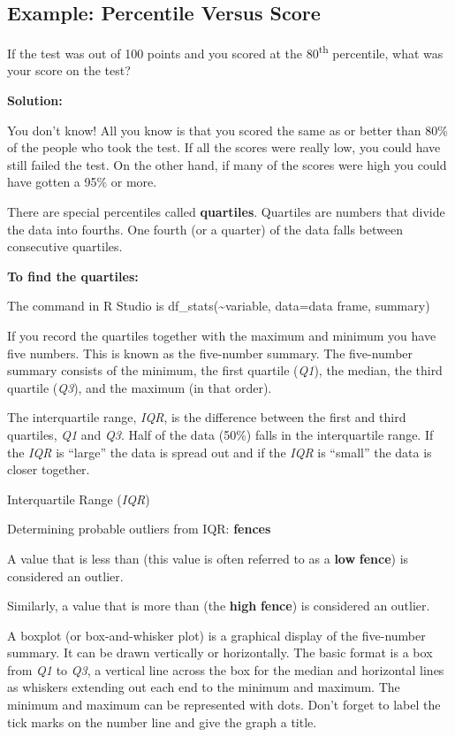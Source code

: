 \documentclass[]{book}
\begin{document}
\hypertarget{example-percentile-versus-score}{%
\subsection{Example: Percentile Versus Score}\label{example-percentile-versus-score}}

If the test was out of 100 points and you scored at the 80\textsuperscript{th} percentile, what was your score on the test?

\textbf{Solution:}

You don't know! All you know is that you scored the same as or better than 80\% of the people who took the test. If all the scores were really low, you could have still failed the test. On the other hand, if many of the scores were high you could have gotten a 95\% or more.

There are special percentiles called \textbf{quartiles}. Quartiles are numbers that divide the data into fourths. One fourth (or a quarter) of the data falls between consecutive quartiles.

\textbf{To find the quartiles:}

The command in R Studio is df\_stats(\textasciitilde{}variable, data=data frame, summary)

If you record the quartiles together with the maximum and minimum you
have five numbers. This is known as the five-number summary. The
five-number summary consists of the minimum, the first quartile (\emph{Q1}),
the median, the third quartile (\emph{Q3}), and the maximum (in that order).

The interquartile range, \emph{IQR}, is the difference between the first and third quartiles, \emph{Q1} and \emph{Q3}. Half of the data (50\%) falls in the interquartile range. If the \emph{IQR} is ``large'' the data is spread out and if the \emph{IQR} is ``small'' the data is closer together.

Interquartile Range (\emph{IQR})

Determining probable outliers from IQR: \textbf{fences}

A value that is less than (this value is often referred to as a \textbf{low} \textbf{fence}) is considered an outlier.

Similarly, a value that is more than (the \textbf{high} \textbf{fence}) is considered an outlier.

A boxplot (or box-and-whisker plot) is a graphical display of the five-number summary. It can be drawn vertically or horizontally. The basic format is a box from \emph{Q1} to \emph{Q3}, a vertical line across the box for the median and horizontal lines as whiskers extending out each end to the minimum and maximum. The minimum and maximum can be represented with dots. Don't forget to label the tick marks on the number line and give the graph a title.
\end{document}
